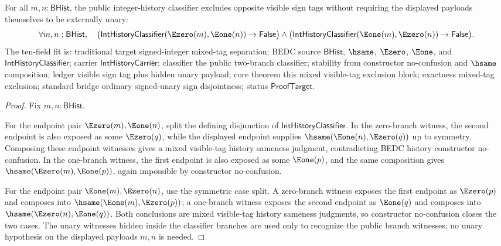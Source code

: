 \begin{theorem}
\label{thm:int-history-classifier-mixed-visible-tag-exclusion}
For all $m,n:\mathsf{BHist}$, the public integer-history classifier excludes
opposite visible sign tags without requiring the displayed payloads themselves
to be externally unary:
$$
\forall m,n:\mathsf{BHist},\quad
\bigl(\mathsf{IntHistoryClassifier}(\Ezero(m),\Eone(n))\to\mathsf{False}\bigr)
\land
\bigl(\mathsf{IntHistoryClassifier}(\Eone(m),\Ezero(n))\to\mathsf{False}\bigr).
$$
The ten-field fit is: traditional target signed-integer mixed-tag separation;
BEDC source $\mathsf{BHist}$, $\hsame$, $\Ezero$, $\Eone$, and
$\mathsf{IntHistoryClassifier}$; carrier $\mathsf{IntHistoryCarrier}$;
classifier the public two-branch classifier; stability from constructor
no-confusion and $\hsame$ composition; ledger visible sign tag plus hidden unary
payload; core theorem this mixed visible-tag exclusion block; exactness
mixed-tag exclusion; standard bridge ordinary signed-unary sign disjointness;
status $\mathsf{ProofTarget}$.
\end{theorem}
\begin{proof}
Fix $m,n:\mathsf{BHist}$.

For the endpoint pair $\Ezero(m),\Eone(n)$, split the defining disjunction of
$\mathsf{IntHistoryClassifier}$. In the zero-branch witness, the second endpoint
is also exposed as some $\Ezero(q)$, while the displayed endpoint supplies
$\hsame(\Eone(n),\Ezero(q))$ up to symmetry. Composing these endpoint witnesses
gives a mixed visible-tag history sameness judgment, contradicting BEDC history
constructor no-confusion. In the one-branch witness, the first endpoint is also
exposed as some $\Eone(p)$, and the same composition gives
$\hsame(\Ezero(m),\Eone(p))$, again impossible by constructor no-confusion.

For the endpoint pair $\Eone(m),\Ezero(n)$, use the symmetric case split. A
zero-branch witness exposes the first endpoint as $\Ezero(p)$ and composes into
$\hsame(\Eone(m),\Ezero(p))$; a one-branch witness exposes the second endpoint
as $\Eone(q)$ and composes into $\hsame(\Ezero(n),\Eone(q))$. Both conclusions
are mixed visible-tag history sameness judgments, so constructor no-confusion
closes the two cases. The unary witnesses hidden inside the classifier branches
are used only to recognize the public branch witnesses; no unary hypothesis on
the displayed payloads $m,n$ is needed.
\end{proof}

